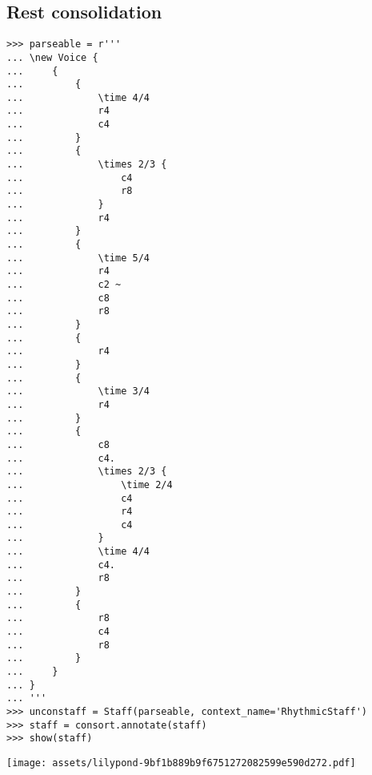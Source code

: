 \subsection{Rest consolidation}

\begin{comment}
<abjad>
parseable = r'''
\new Voice {
    {
        {
            \time 4/4
            r4
            c4
        }
        {
            \times 2/3 {
                c4
                r8
            }
            r4
        }
        {
            \time 5/4
            r4
            c2 ~
            c8
            r8
        }
        {
            r4
        }
        {
            \time 3/4
            r4
        }
        {
            c8
            c4.
            \break
            \times 2/3 {
                \time 2/4
                c4
                r4
                c4
            }
            \time 4/4
            c4.
            r8
        }
        {
            r8
            c4
            r8
        }
    }
}
'''
unconsolidated_staff = Staff(parseable, context_name='RhythmicStaff')
unconsolidated_staff = consort.annotate(unconsolidated_staff)
show(unconsolidated_staff)
</abjad>
\end{comment}

\begin{singlespacing}
\vspace{-0.5\baselineskip}
\begin{lstlisting}
>>> parseable = r'''
... \new Voice {
...     {
...         {
...             \time 4/4
...             r4
...             c4
...         }
...         {
...             \times 2/3 {
...                 c4
...                 r8
...             }
...             r4
...         }
...         {
...             \time 5/4
...             r4
...             c2 ~
...             c8
...             r8
...         }
...         {
...             r4
...         }
...         {
...             \time 3/4
...             r4
...         }
...         {
...             c8
...             c4.
...             \times 2/3 {
...                 \time 2/4
...                 c4
...                 r4
...                 c4
...             }
...             \time 4/4
...             c4.
...             r8
...         }
...         {
...             r8
...             c4
...             r8
...         }
...     }
... }
... '''
>>> unconstaff = Staff(parseable, context_name='RhythmicStaff')
>>> staff = consort.annotate(staff)
>>> show(staff)
\end{lstlisting}
\noindent\texttt{[image: assets/lilypond-9bf1b889b9f6751272082599e590d272.pdf]}
\end{singlespacing}

